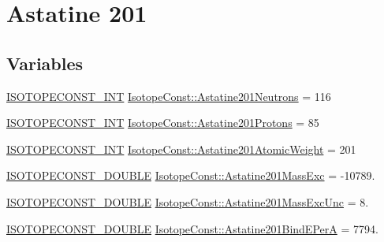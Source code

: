 \hypertarget{group___isotope_const-_astatine-_at201}{}\section{Astatine 201}
\label{group___isotope_const-_astatine-_at201}
\subsection*{Variables}
\begin{DoxyCompactItemize}
\item 
\mbox{\hyperlink{group___isotope_const-_macros_ga5f18360b3e99483a35c32d789e62621c}{I\+S\+O\+T\+O\+P\+E\+C\+O\+N\+S\+T\+\_\+\+I\+NT}} \mbox{\hyperlink{group___isotope_const-_astatine-_at201_ga7f64b5c86192bdee5e454d2584d689f9}{Isotope\+Const\+::\+Astatine201\+Neutrons}} = 116
\item 
\mbox{\hyperlink{group___isotope_const-_macros_ga5f18360b3e99483a35c32d789e62621c}{I\+S\+O\+T\+O\+P\+E\+C\+O\+N\+S\+T\+\_\+\+I\+NT}} \mbox{\hyperlink{group___isotope_const-_astatine-_at201_ga847cf81d89531b3a16e4c5115bdb304d}{Isotope\+Const\+::\+Astatine201\+Protons}} = 85
\item 
\mbox{\hyperlink{group___isotope_const-_macros_ga5f18360b3e99483a35c32d789e62621c}{I\+S\+O\+T\+O\+P\+E\+C\+O\+N\+S\+T\+\_\+\+I\+NT}} \mbox{\hyperlink{group___isotope_const-_astatine-_at201_gae851a198899ce8f2b96bc691d583dbbd}{Isotope\+Const\+::\+Astatine201\+Atomic\+Weight}} = 201
\item 
\mbox{\hyperlink{group___isotope_const-_macros_ga8f45a7272ce02c0b4c65c44636ed719a}{I\+S\+O\+T\+O\+P\+E\+C\+O\+N\+S\+T\+\_\+\+D\+O\+U\+B\+LE}} \mbox{\hyperlink{group___isotope_const-_astatine-_at201_ga661d547280f00eadf64372a3741a7722}{Isotope\+Const\+::\+Astatine201\+Mass\+Exc}} = -\/10789.
\item 
\mbox{\hyperlink{group___isotope_const-_macros_ga8f45a7272ce02c0b4c65c44636ed719a}{I\+S\+O\+T\+O\+P\+E\+C\+O\+N\+S\+T\+\_\+\+D\+O\+U\+B\+LE}} \mbox{\hyperlink{group___isotope_const-_astatine-_at201_gad58f6401adbf2a9bf2667de8345d90df}{Isotope\+Const\+::\+Astatine201\+Mass\+Exc\+Unc}} = 8.
\item 
\mbox{\hyperlink{group___isotope_const-_macros_ga8f45a7272ce02c0b4c65c44636ed719a}{I\+S\+O\+T\+O\+P\+E\+C\+O\+N\+S\+T\+\_\+\+D\+O\+U\+B\+LE}} \mbox{\hyperlink{group___isotope_const-_astatine-_at201_ga43f7535258d370b52797a85b75b7144c}{Isotope\+Const\+::\+Astatine201\+Bind\+E\+PerA}} = 7794.
\item 

\end{DoxyCompactItemize}
